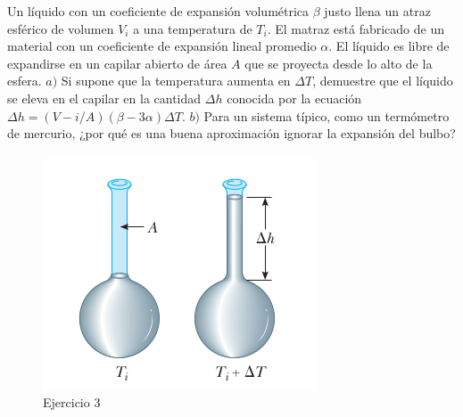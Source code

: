 \begin{mdframed}[style=warning]
	\begin{ejercicio}
		Un líquido con un coeficiente de expansión volumétrica $\beta$ justo llena un atraz esférico de volumen $V_i$ a una temperatura de $T_i$. El matraz está fabricado de un material con un coeficiente de expansión lineal promedio $\alpha$. El líquido es libre de expandirse en un capilar abierto de área $A$ que se proyecta desde lo alto de la esfera. $a)$ Si supone que la temperatura aumenta en $\Delta T$, demuestre que el líquido se eleva en el capilar en la cantidad $\Delta h$ conocida por la ecuación $\Delta h = (V-i/A)(\beta - 3\alpha) \Delta T$. $b)$ Para un sistema típico, como un termómetro de mercurio, ¿por qué es una buena aproximación ignorar la expansión del bulbo?
		\begin{figure}[H]
			\centering
			\includegraphics[scale=0.5]{./img/bulbo.png}
			\caption{Ejercicio 3}
			\label{bulbo}
		\end{figure}
	\end{ejercicio}
\end{mdframed}






















